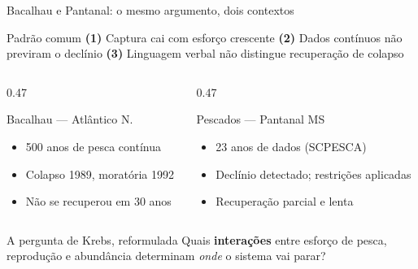 \documentclass[12pt]{beamer}
\begin{document}
\begin{frame}{Bacalhau e Pantanal: o mesmo argumento, dois contextos}

  \begin{block}{Padrão comum}
    {\footnotesize\textbf{(1)} Captura cai com esforço crescente\enspace
    \textbf{(2)} Dados contínuos não previram o declínio\enspace
    \textbf{(3)} Linguagem verbal não distingue recuperação de colapso}
  \end{block}

  \vspace{3pt}
  \begin{columns}[T]
    \begin{column}{0.47\textwidth}
      \begin{exampleblock}{Bacalhau — Atlântico N.}
        {\footnotesize
        \begin{itemize}\setlength\itemsep{0pt}\setlength\parskip{0pt}
          \item 500 anos de pesca contínua
          \item Colapso 1989, moratória 1992
          \item Não se recuperou em 30 anos
        \end{itemize}}
      \end{exampleblock}
    \end{column}
    \begin{column}{0.47\textwidth}
      \begin{exampleblock}{Pescados — Pantanal MS}
        {\footnotesize
        \begin{itemize}\setlength\itemsep{0pt}\setlength\parskip{0pt}
          \item 23 anos de dados (SCPESCA)
          \item Declínio detectado; restrições aplicadas
          \item Recuperação parcial e lenta
        \end{itemize}}
      \end{exampleblock}
    \end{column}
  \end{columns}

  \vspace{3pt}
  \begin{alertblock}{A pergunta de Krebs, reformulada}
    {\footnotesize Quais \textbf{interações} entre esforço de pesca,
    reprodução e abundância determinam \emph{onde} o sistema vai parar?}
  \end{alertblock}

\end{frame}
\end{document}
